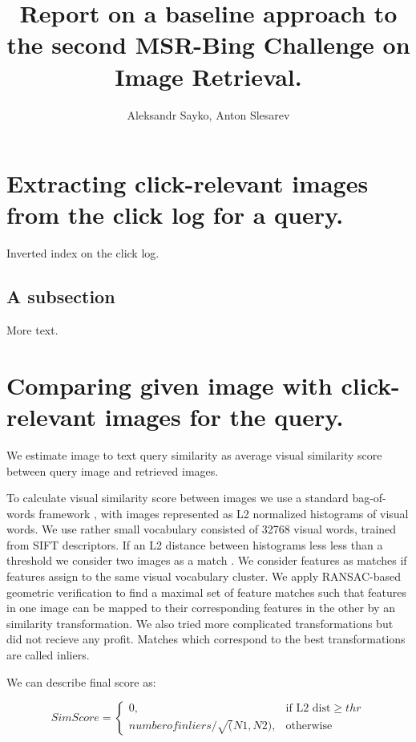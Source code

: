 \documentclass[11pt]{article} %
\title{Report on a baseline approach to the second MSR-Bing Challenge on Image Retrieval.}
\author{Aleksandr Sayko, Anton Slesarev}
\begin{document}
\maketitle


\section{Extracting click-relevant images from the  click log for a query.}

Inverted index on the click log.

\subsection{A subsection}

More text.

\section{Comparing given image with click-relevant images for the query.}
We estimate image to text query similarity as average visual
similarity score between query image and retrieved images.

To calculate visual similarity score between images we use a standard bag-of-words
framework \cite{Sivic03}, with images represented as L2 normalized histograms of
visual words. We use rather small vocabulary consisted of 32768 visual
words, trained from SIFT descriptors. If an L2 distance between
histograms less less than a threshold we consider two images as a match . We consider features as matches if
features assign to the same visual vocabulary cluster. We apply
RANSAC-based geometric verification to find a maximal set of feature
matches such that features in one image can be mapped to their
corresponding features in the other by an similarity transformation.
We also tried more complicated transformations but did not recieve any
profit. Matches which correspond to the best transformations are
called inliers.

We can describe final score as:

$$
    SimScore = 
\begin{cases}
    0,& \text{if L2 dist} \geq thr\\
    number of inliers / \sqrt(N1, N2),              & \text{otherwise}
\end{cases}
$$
\end{document}
